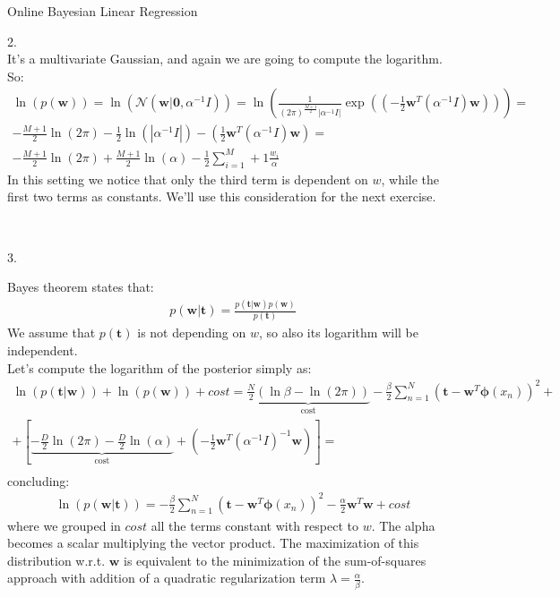 \documentclass[english]{exercisesheet}
\begin{document}
\begin{nexercise}{Online Bayesian Linear Regression}
  \par 
  \begin{solution} 2.
  \\ It's a multivariate Gaussian, and again we are going to compute the logarithm. So:
  \begin{align*}
  \ln(p(\bm{w})) = \ln(\mathcal{N}(\bm {w} | \bm {0}, \alpha^{-1}I)) =  \ln\left(\frac{1}{(2\pi)^{\frac{M+1}{2}}|\alpha^{-1}I|}\exp\left((-\frac{1}{2}\bm{w}^{T}(\alpha^{-1}I)\bm{w})\right) \right)= \\ -\frac{M+1}{2}\ln(2\pi)-\frac{1}{2}\ln(|\alpha^{-1}I|)-\left(\frac{1}{2}\bm{w}^{T}(\alpha^{-1}I)\bm{w}\right) = \\ -\frac{M+1}{2}\ln(2\pi)+\frac{M+1}{2}\ln(\alpha)-\frac{1}{2}\sum_{i=1}^M+1 \frac{w_i}{\alpha}
  \end{align*}
  In this setting we notice that only the third term is dependent on $w$, while the first two terms as constants. We'll use this consideration for the next exercise.
    \end{solution}\\
    \begin{solution} 3.
  \par 
  Bayes theorem states that:
  \begin{align*}
  p(\bm{w}|\bm{t}) = \frac{p(\bm{t}|\bm{w})p(\bm{w})}{p(\bm{t})}
  \end{align*}
  We assume that $p(\bm t)$ is not depending on $w$, so also its logarithm will be independent. \\ Let's compute the logarithm of the posterior simply as:
  \begin{align*}
      \ln(p(\bm{t}|\bm{w}))+ \ln(p(\bm{w})) + cost = \underbrace{\frac{N}{2}\left(\ln\beta-\ln(2\pi)\right)}_\text{cost} - \frac{\beta}{2}\sum_{n=1}^{N}(\bm{t}-\bm{w}^{T}\bm{\phi}(x_{n}))^{2} + \\ + \left[\underbrace{-\frac{D}{2}\ln(2\pi)-\frac{D}{2}\ln(\alpha)}_\text{cost}+\left(-\frac{1}{2}\bm{w}^{T}(\alpha^{-1}I)^{-1}\bm{w}\right)\right] = \\
      \end{align*}
      concluding:
     \begin{align*}
      \ln(p(\bm{w}|\bm{t})) = -\frac{\beta}{2}\sum_{n=1}^{N}(\bm{t}-\bm{w}^{T}\bm{\phi}(x_{n}))^{2}-\frac{\alpha}{2}\bm{w}^{T}\bm{w} + cost
    \end{align*}
    where we grouped in $cost$ all the terms constant with respect to $w$. The alpha becomes a scalar multiplying the vector product.
    The maximization of this distribution w.r.t. $\bm{w}$ is equivalent to the minimization of the sum-of-squares approach with addition of a quadratic regularization term $\lambda = \frac{\alpha}{\beta}$. \\

\end{solution}
\end{nexercise}
\end{document}
